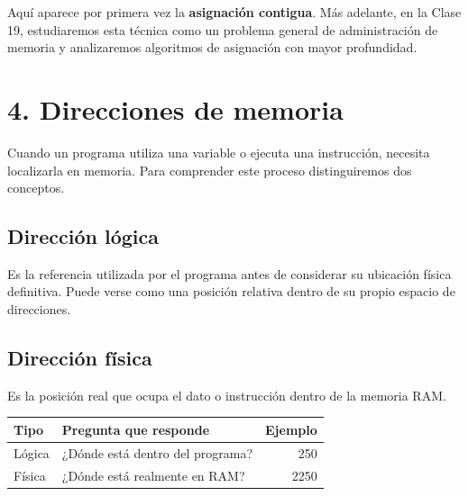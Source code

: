 \documentclass[
  spanish,
  letterpaper,
]{scrbook}
\newcounter{none} %
\begin{document}
\begin{tcolorbox}[enhanced jigsaw, arc=.35mm, bottomrule=.15mm, bottomtitle=1mm, breakable, colback=white, colbacktitle=quarto-callout-note-color!10!white, colframe=quarto-callout-note-color-frame, coltitle=black, left=2mm, leftrule=.75mm, opacityback=0, opacitybacktitle=0.6, rightrule=.15mm, title=\textcolor{quarto-callout-note-color}{\faInfo}\hspace{0.5em}{Conexión con la siguiente etapa del curso}, titlerule=0mm, toprule=.15mm, toptitle=1mm]

Aquí aparece por primera vez la \textbf{asignación contigua}. Más
adelante, en la Clase 19, estudiaremos esta técnica como un problema
general de administración de memoria y analizaremos algoritmos de
asignación con mayor profundidad.

\end{tcolorbox}

\section{4. Direcciones de memoria}\label{direcciones-de-memoria}

Cuando un programa utiliza una variable o ejecuta una instrucción,
necesita localizarla en memoria. Para comprender este proceso
distinguiremos dos conceptos.

\subsection{Dirección lógica}\label{direcciuxf3n-luxf3gica}

Es la referencia utilizada por el programa antes de considerar su
ubicación física definitiva. Puede verse como una posición relativa
dentro de su propio espacio de direcciones.

\subsection{Dirección física}\label{direcciuxf3n-fuxedsica-1}

Es la posición real que ocupa el dato o instrucción dentro de la memoria
RAM.

{\def\LTcaptype{none} %
\begin{longtable}[]{@{}llr@{}}
\toprule\noalign{}
Tipo & Pregunta que responde & Ejemplo \\
\midrule\noalign{}
\endhead
\bottomrule\noalign{}
\endlastfoot
Lógica & ¿Dónde está dentro del programa? & 250 \\
Física & ¿Dónde está realmente en RAM? & 2250 \\
\end{longtable}
}
\end{document}
